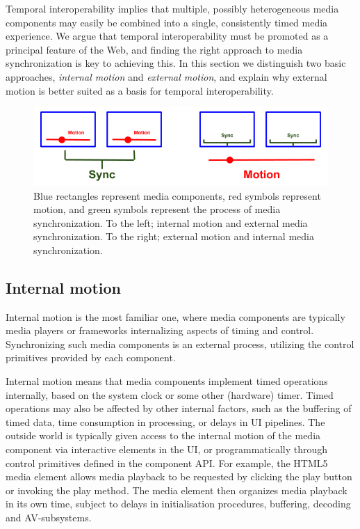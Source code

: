 Temporal interoperability implies that multiple, possibly heterogeneous media
components may easily be combined into a single, consistently timed media
experience. We argue that temporal interoperability must be promoted as a
principal feature of the Web, and finding the right approach to media
synchronization is key to achieving this. In this section we distinguish two
basic approaches, \emph{internal motion} and \emph{external motion}, and 
explain why external motion is better suited as a basis for temporal
interoperability.

\begin{figure}[h]
\centering
\includegraphics[scale=.4]{fig/internal-external.png}
\caption{
	Blue rectangles represent media components, red symbols represent motion, and green symbols represent the process of media synchronization. To the left; internal motion and external media synchronization. To the right; external motion and internal media synchronization.
}
\label{fig:internalexternal}
\end{figure}


\subsection{Internal motion}

Internal motion is the most familiar one, where media components are typically
media players or frameworks internalizing aspects of timing and control.
Synchronizing such media components is an external process, utilizing the
control primitives provided by each component.


Internal motion means that media components implement timed operations
internally, based on the system clock or some other (hardware) timer. Timed
operations may also be affected by other internal factors, such as the
buffering of timed data, time consumption in processing, or delays in UI
pipelines. The outside world is typically given access to the internal motion
of the media component via interactive elements in the UI, or programmatically
through control primitives defined in the component API. For example, the
HTML5 media element allows media playback to be requested by clicking the play
button or invoking the play method. The media element then organizes media
playback in its own time, subject to delays in initialisation procedures,
buffering, decoding and AV-subsystems.

